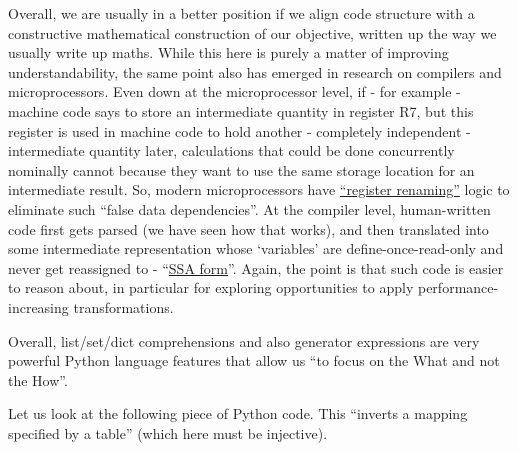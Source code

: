 \documentclass[11pt]{article}
\begin{document}
Overall, we are usually in a better position if we align code structure
with a constructive mathematical construction of our objective, written
up the way we usually write up maths. While this here is purely a matter
of improving understandability, the same point also has emerged in
research on compilers and microprocessors. Even down at the
microprocessor level, if - for example - machine code says to store an
intermediate quantity in register R7, but this register is used in
machine code to hold another - completely independent - intermediate
quantity later, calculations that could be done concurrently nominally
cannot because they want to use the same storage location for an
intermediate result. So, modern microprocessors have
\href{https://en.wikipedia.org/wiki/Register_renaming}{``register
renaming''} logic to eliminate such ``false data dependencies''. At the
compiler level, human-written code first gets parsed (we have seen how
that works), and then translated into some intermediate representation
whose `variables' are define-once-read-only and never get reassigned to
-
``\href{https://en.wikipedia.org/wiki/Static_single_assignment_form}{SSA
form}''. Again, the point is that such code is easier to reason about,
in particular for exploring opportunities to apply
performance-increasing transformations.

Overall, list/set/dict comprehensions and also generator expressions are
very powerful Python language features that allow us ``to focus on the
What and not the How''.

Let us look at the following piece of Python code. This ``inverts a
mapping specified by a table'' (which here must be injective).
\end{document}
